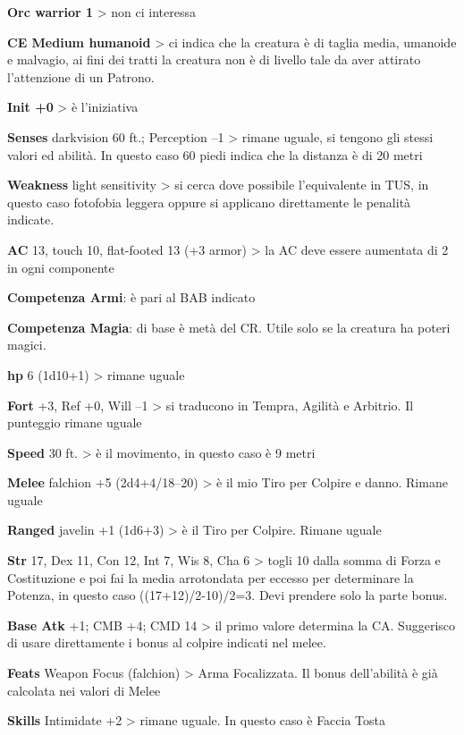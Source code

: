 \documentclass[a4paper,11pt,twoside,openany]{book}
\begin{document}
\textbf{Orc warrior 1} \textgreater{} non ci interessa

\textbf{CE Medium humanoid} \textgreater{} ci indica che la creatura è di taglia media, umanoide e malvagio, ai fini dei tratti la creatura non è di livello tale da aver attirato l'attenzione di un Patrono.

\textbf{Init +0} \textgreater{} è l'iniziativa

\textbf{Senses} darkvision 60 ft.; Perception --1 \textgreater{} rimane uguale, si tengono gli stessi valori ed abilità. In questo caso 60 piedi indica che la distanza è di 20 metri

\textbf{Weakness} light sensitivity \textgreater{} si cerca dove possibile l'equivalente in TUS, in questo caso fotofobia leggera oppure si applicano direttamente le penalità indicate.

\textbf{AC} 13, touch 10, flat-footed 13 (+3 armor) \textgreater{} la AC deve essere aumentata di 2 in ogni componente

\textbf{Competenza Armi}: è pari al BAB indicato

\textbf{Competenza Magia}: di base è metà del CR. Utile solo se la creatura ha poteri magici.

\textbf{hp} 6 (1d10+1) \textgreater{} rimane uguale

\textbf{Fort} +3, Ref +0, Will --1 \textgreater{} si traducono in Tempra, Agilità e Arbitrio. Il punteggio rimane uguale

\textbf{Speed} 30 ft. \textgreater{} è il movimento, in questo
caso è 9 metri

\textbf{Melee} falchion +5 (2d4+4/18--20) \textgreater{} è il mio Tiro per Colpire e danno. Rimane uguale

\textbf{Ranged} javelin +1 (1d6+3) \textgreater{} è il Tiro per Colpire. Rimane uguale

\textbf{Str} 17, Dex 11, Con 12, Int 7, Wis 8, Cha 6 \textgreater{} togli 10 dalla somma di Forza e Costituzione e poi fai la media arrotondata per eccesso per determinare la Potenza, in questo caso ((17+12)/2-10)/2=3. Devi prendere solo la parte bonus.

\textbf{Base Atk} +1; CMB +4; CMD 14 \textgreater{} il primo valore determina la CA. Suggerisco di usare direttamente i bonus al colpire indicati nel melee.

\textbf{Feats} Weapon Focus (falchion) \textgreater{} Arma Focalizzata. Il bonus dell'abilità è già calcolata nei valori di Melee

\textbf{Skills} Intimidate +2 \textgreater{} rimane uguale. In questo caso è Faccia Tosta
\end{document}
